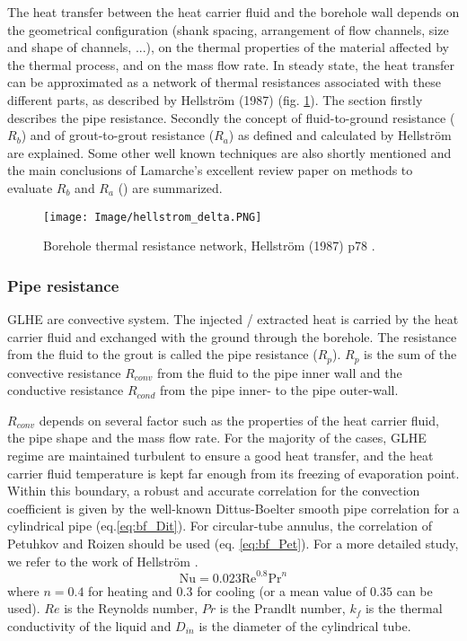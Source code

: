 \documentclass[a4paper,oneside,11pt]{report}
\begin{document}
The heat transfer between the heat carrier fluid and the borehole wall depends on the geometrical configuration (shank spacing, arrangement of flow channels, size and shape of channels, ...), on the thermal properties of the material affected by the thermal process, and on the mass flow rate. In steady state, the heat transfer can be approximated as a network of thermal resistances associated with these different parts, as described by Hellstr\"om (1987) \cite{hel91} (fig. \ref{fig:bf_helDel}). The section firstly describes the pipe resistance. Secondly the concept of fluid-to-ground resistance ($R_b$) and of grout-to-grout resistance ($R_a$) as defined and calculated by Hellstr\"om are explained. Some other well known techniques are also shortly mentioned and the main conclusions of Lamarche's excellent review paper on methods to evaluate $R_b$ and $R_a$ (\cite{lam10}) are summarized.

\begin{figure}[hbtp] 
	\centering
	\texttt{[image: Image/hellstrom\_delta.PNG]}
	\caption{Borehole thermal resistance network, Hellstr\"om (1987) p78 \cite{hel91}.}
	\label{fig:bf_helDel}
\end{figure}

\subsubsection{Pipe resistance} \label{sssec:bf_Rp} 

GLHE are convective system. The injected / extracted heat is carried by the heat carrier fluid and exchanged with the ground through the borehole. The resistance from the fluid to the grout is called the pipe resistance ($R_p$). $R_p$ is the sum of the convective resistance $R_{conv}$ from the fluid to the pipe inner wall and the conductive resistance $R_{cond}$ from the pipe inner- to the pipe outer-wall.

$R_{conv}$ depends on several factor such as the properties of the heat carrier fluid, the pipe shape and the mass flow rate. For the majority of the cases, GLHE regime are maintained turbulent to ensure a good heat transfer, and the heat carrier fluid temperature is kept far enough from its freezing of evaporation point. Within this boundary, a robust and accurate correlation for the convection coefficient is given by the well-known Dittus-Boelter smooth pipe correlation for a cylindrical pipe (eq.\ref{eq:bf_Dit}). For circular-tube annulus, the correlation of Petuhkov and Roizen should be used (eq. \ref{eq:bf_Pet}). For a more detailed study, we refer to the work of Hellstr\"om \cite{hel91}. 
\begin{equation} \label{eq:bf_Dit}
	\text{Nu} = 0.023 \mathrm{Re}^{0.8} \mathrm{Pr}^n
\end{equation}
where $n=0.4$ for heating and $0.3$ for cooling (or a mean value of $0.35$ can be used). $Re$ is the Reynolds number, $Pr$ is the Prandlt number, $k_f$ is the thermal conductivity of the liquid and $D_{in}$ is the diameter of the cylindrical tube.
\end{document}
